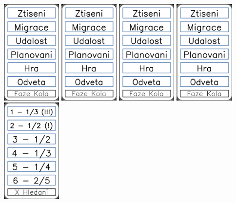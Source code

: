 \documentclass[a4paper]{article}
\begin{document}
	\includegraphics[width=3.0cm]{img-8_0}
	\includegraphics[width=3.0cm]{img-8_1}
	\includegraphics[width=3.0cm]{img-8_2}
	\includegraphics[width=3.0cm]{img-8_3}
	\includegraphics[width=3.0cm]{img-8_4}
\end{document}
